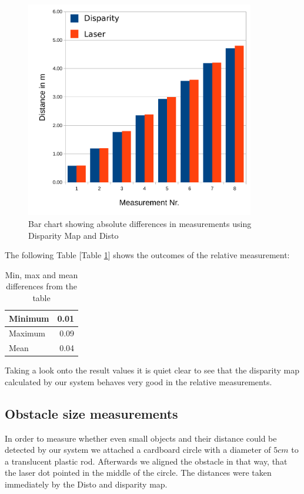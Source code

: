 \documentclass[11pt]{article}
\begin{document}
\begin{figure}[H]
        \centering
        \includegraphics[width=10cm]{images/relative-measurements.pdf}
        \caption{Bar chart showing absolute differences in measurements using Disparity Map and Disto}
        \label{fig:relative-chart}
\end{figure}

The following Table [Table \ref{table:relative-results}] shows the outcomes of the relative measurement:

\begin{table}[htbp]
	\begin{center}
	\begin{tabular}{|l|r|}
	\hline
	Minimum & 0.01 \\ \hline
	Maximum & 0.09 \\ \hline
	Mean & 0.04 \\ \hline
	\end{tabular}
	\end{center}
	\caption{Min, max and mean differences from the table}
	\label{table:relative-results}
\end{table}

Taking a look onto the result values it is quiet clear to see that the disparity map calculated by our system behaves very good in the relative measurements.


\subsection{Obstacle size measurements}
In order to measure whether even small objects and their distance could be detected by our system we attached a cardboard circle with a diameter of $5cm$ to a translucent plastic rod. Afterwards we aligned the obstacle in that way, that the laser dot pointed in the middle of the circle. The distances were taken immediately by the Disto and disparity map.
\end{document}
